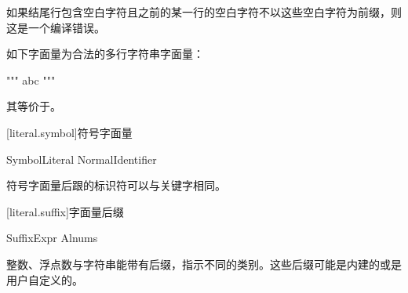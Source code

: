 如果结尾行包含空白字符且之前的某一行的空白字符不以这些空白字符为前缀，则这是一个编译错误。

\enterexample

如下字面量为合法的多行字符串字面量：

\begin{codeblock}
"""
abc
"""
\end{codeblock}

其等价于。

\exitexample

[literal.symbol]{符号字面量}

\begin{bnf}{SymbolLiteral}
     NormalIdentifier
\end{bnf}

符号字面量后跟的标识符可以与关键字相同。

[literal.suffix]{字面量后缀}

\begin{bnf}{SuffixExpr}
    Alnums
\end{bnf}

整数、浮点数与字符串能带有后缀，指示不同的类别。这些后缀可能是内建的或是用户自定义的。